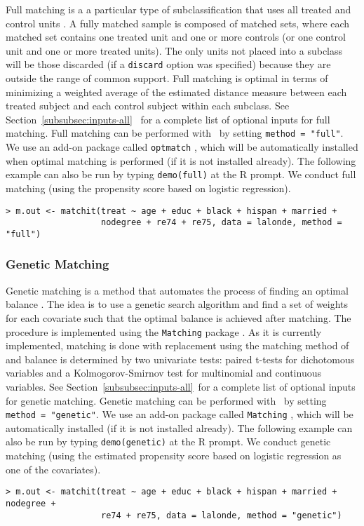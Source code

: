 Full matching is a a particular type of subclassification that uses
all treated and control units \citep{Rosenbaum02, Hansen04}.  A fully
matched sample is composed of matched sets, where each matched set
contains one treated unit and one or more controls (or one control
unit and one or more treated units).  The only units not placed into a
subclass will be those discarded (if a \texttt{discard} option was
specified) because they are outside the range of common support.  Full
matching is optimal in terms of minimizing a weighted average of the
estimated distance measure between each treated subject and each
control subject within each subclass.  See
Section~\ref{subsubsec:inputs-all}~
for a complete list of optional inputs for full matching.  Full
matching can be performed with \MatchIt\ by setting \texttt{method =
  "full"}.  We use an add-on package called \texttt{optmatch}
\citep{Hansen04}, which will be automatically installed when optimal
matching is performed (if it is not installed already).  The following
example can also be run by typing {\tt demo(full)} at the R prompt.
We conduct full matching (using the propensity score based on logistic
regression).
\begin{verbatim}
> m.out <- matchit(treat ~ age + educ + black + hispan + married +
                   nodegree + re74 + re75, data = lalonde, method = "full")
\end{verbatim}

\subsubsection{Genetic Matching}
\label{subsub:genetic}

Genetic matching is a method that automates the process of finding an
optimal balance \citep{DiaSek05}. The idea is to use a genetic search
algorithm and find a set of weights for each covariate such that the
optimal balance is achieved after matching. The procedure is
implemented using the {\tt Matching} package \citep{Sekhon04}. As it
is currently implemented, matching is done with replacement using the
matching method of \citet{AbaImb04} and balance is determined by two
univariate tests: paired t-tests for dichotomous variables and a
Kolmogorov-Smirnov test for multinomial and continuous variables.  See
Section~\ref{subsubsec:inputs-all}~for a complete list of optional
inputs for genetic matching.  Genetic matching can be performed with
\MatchIt\ by setting \texttt{method = "genetic"}.  We use an add-on
package called \texttt{Matching} \citep{Sekhon04}, which will be
automatically installed (if it is not installed already). The
following example can also be run by typing {\tt demo(genetic)} at the
R prompt.  We conduct genetic matching (using the estimated propensity
score based on logistic regression as one of the covariates).
\begin{verbatim}
> m.out <- matchit(treat ~ age + educ + black + hispan + married + nodegree + 
                   re74 + re75, data = lalonde, method = "genetic")
\end{verbatim}



